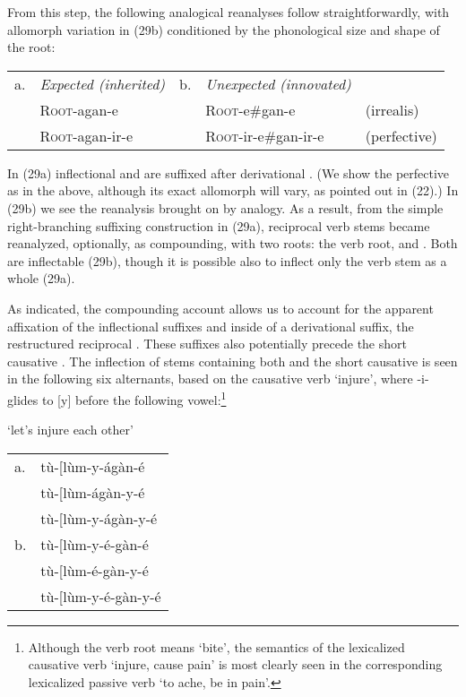 \documentclass[output=paper,
modfonts
]{LSP/langsci}
\begin{document}
\noindent From this step, the following analogical reanalyses follow
straightforwardly, with allomorph variation in (29b) conditioned by the
phonological size and shape of the root:

\ea\begin{tabular}[t]{@{}llrll}
a. & \emph{Expected (inherited)} & b. & \emph{Unexpected (innovated)} & \\
& \textsc{Root}-agan-e & & \textsc{Root}-e\#gan-e & (irrealis) \\
 & \textsc{Root}-agan-ir-e & & \textsc{Root}-ir-e\#gan-ir-e & (perfective)
 \end{tabular}
 \z

\noindent In (29a) inflectional  and  are suffixed after
derivational . (We show the perfective as  in
the above, although its exact allomorph will vary, as pointed out in
(22).) In (29b) we see the reanalysis brought on by analogy. As a
result, from the simple right-branching suffixing construction in (29a),
reciprocal verb stems became reanalyzed, optionally, as compounding,
with two roots: the verb root, and . Both are inflectable
(29b), though it is possible also to inflect only the verb stem as a
whole (29a).

As indicated, the compounding account allows us to account for the
apparent affixation of the inflectional suffixes  and
 inside of a derivational suffix, the restructured
reciprocal . These suffixes also potentially precede the
short causative . The inflection of stems containing both
 and the short causative is seen in the following six
alternants, based on the causative verb  `injure', where
-i- glides to {[}y{]} before the following vowel:\footnote{Although the
  verb root  means `bite', the semantics of the lexicalized
  causative verb  `injure, cause pain' is most clearly
  seen in the corresponding lexicalized passive verb  `to
  ache, be in pain'.}

\ea`let's injure each other'\\
\begin{tabular}{@{}ll}
a. &  tù-{[}lùm-y-ágàn-é \\
 &	tù-{[}lùm-ágàn-y-é \\
 &	tù-{[}lùm-y-ágàn-y-é  \\
b. &  tù-{[}lùm-y-é-gàn-é  \\
 &	tù-{[}lùm-é-gàn-y-é \\
 & 	tù-{[}lùm-y-é-gàn-y-é \\
\end{tabular}
\z
\end{document}
